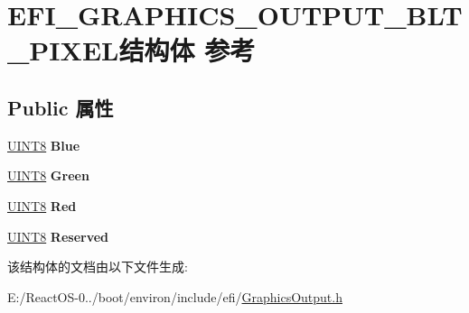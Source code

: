 \hypertarget{struct_e_f_i___g_r_a_p_h_i_c_s___o_u_t_p_u_t___b_l_t___p_i_x_e_l}{}\section{E\+F\+I\+\_\+\+G\+R\+A\+P\+H\+I\+C\+S\+\_\+\+O\+U\+T\+P\+U\+T\+\_\+\+B\+L\+T\+\_\+\+P\+I\+X\+E\+L结构体 参考}
\label{struct_e_f_i___g_r_a_p_h_i_c_s___o_u_t_p_u_t___b_l_t___p_i_x_e_l}
\subsection*{Public 属性}
\begin{DoxyCompactItemize}
\item 
\mbox{\label{struct_e_f_i___g_r_a_p_h_i_c_s___o_u_t_p_u_t___b_l_t___p_i_x_e_l_acc5c6ed0f04e061409fb9e9aa3767205}} 
\hyperlink{_processor_bind_8h_ab27e9918b538ce9d8ca692479b375b6a}{U\+I\+N\+T8} {\bfseries Blue}
\item 
\mbox{\label{struct_e_f_i___g_r_a_p_h_i_c_s___o_u_t_p_u_t___b_l_t___p_i_x_e_l_a7623320e5241a849b0495cebbc51923d}} 
\hyperlink{_processor_bind_8h_ab27e9918b538ce9d8ca692479b375b6a}{U\+I\+N\+T8} {\bfseries Green}
\item 
\mbox{\label{struct_e_f_i___g_r_a_p_h_i_c_s___o_u_t_p_u_t___b_l_t___p_i_x_e_l_a34d85af09804ce9376a131bbe6d915e7}} 
\hyperlink{_processor_bind_8h_ab27e9918b538ce9d8ca692479b375b6a}{U\+I\+N\+T8} {\bfseries Red}
\item 
\mbox{\label{struct_e_f_i___g_r_a_p_h_i_c_s___o_u_t_p_u_t___b_l_t___p_i_x_e_l_a3fde82079e52dc014476bfa51eae6156}} 
\hyperlink{_processor_bind_8h_ab27e9918b538ce9d8ca692479b375b6a}{U\+I\+N\+T8} {\bfseries Reserved}
\end{DoxyCompactItemize}


该结构体的文档由以下文件生成\+:\begin{DoxyCompactItemize}
\item 
E\+:/\+React\+O\+S-\/0../boot/environ/include/efi/\hyperlink{_graphics_output_8h}{Graphics\+Output.\+h}\end{DoxyCompactItemize}
